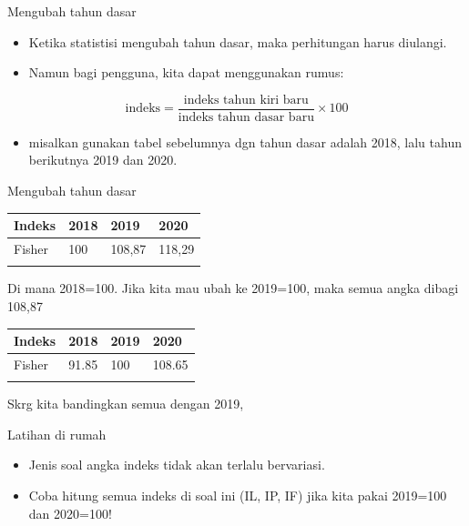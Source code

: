 \documentclass[
  ignorenonframetext,
]{beamer}
\providecommand{\tightlist}{%
  \setlength{\itemsep}{0pt}\setlength{\parskip}{0pt}}\usepackage{longtable,booktabs,array}
\begin{document}
\begin{frame}{Mengubah tahun dasar}
\label{mengubah-tahun-dasar}
\begin{itemize}
\item
  Ketika statistisi mengubah tahun dasar, maka perhitungan harus
  diulangi.
\item
  Namun bagi pengguna, kita dapat menggunakan rumus:
\end{itemize}

\[
\text{indeks}=\frac{\text{indeks tahun kiri baru}}{\text{indeks tahun dasar baru}}\times 100
\]

\begin{itemize}
\tightlist
\item
  misalkan gunakan tabel sebelumnya dgn tahun dasar adalah 2018, lalu
  tahun berikutnya 2019 dan 2020.
\end{itemize}
\end{frame}

\begin{frame}{Mengubah tahun dasar}
\label{mengubah-tahun-dasar-1}
\begin{longtable}[]{@{}llll@{}}
\toprule\noalign{}
Indeks & 2018 & 2019 & 2020 \\
\midrule\noalign{}
\endhead
Fisher & 100 & 108,87 & 118,29 \\
\bottomrule\noalign{}
\end{longtable}

Di mana 2018=100. Jika kita mau ubah ke 2019=100, maka semua angka
dibagi 108,87

\begin{longtable}[]{@{}llll@{}}
\toprule\noalign{}
Indeks & 2018 & 2019 & 2020 \\
\midrule\noalign{}
\endhead
Fisher & 91.85 & 100 & 108.65 \\
\bottomrule\noalign{}
\end{longtable}

Skrg kita bandingkan semua dengan 2019,
\end{frame}

\begin{frame}{Latihan di rumah}
\label{latihan-di-rumah}
\begin{itemize}
\item
  Jenis soal angka indeks tidak akan terlalu bervariasi.
\item
  Coba hitung semua indeks di soal ini (IL, IP, IF) jika kita pakai
  2019=100 dan 2020=100!
\end{itemize}
\end{frame}
\end{document}
